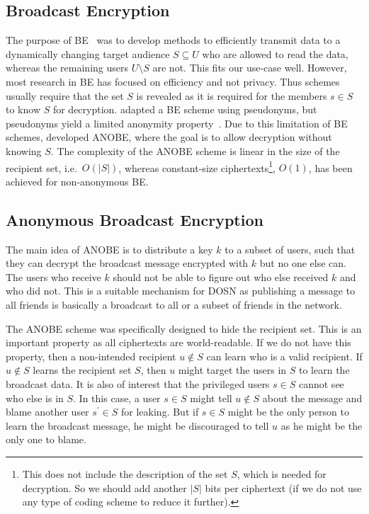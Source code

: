 \subsection{Broadcast Encryption}\label{sec:BE}

The purpose of \ac{BE}~\cite{broadcastenc} was to develop methods to 
efficiently transmit data to a dynamically changing target audience 
\(S\subseteq U\) who are allowed to read the data, whereas the remaining users 
\(U\setminus S\) are not.
This fits our use-case well.
However, most research in \ac{BE} has focused on efficiency and not privacy.
Thus schemes usually require that the set \(S\) is revealed as it is required 
for the members \(s\in S\) to know \(S\) for decryption.
\citet{gunther2012cryptographic} adapted a \ac{BE} scheme using pseudonyms, but 
pseudonyms yield a limited anonymity property~\cite{gunther2012cryptographic}.
Due to this limitation of \ac{BE} schemes, \citet{anobe} developed \ac{ANOBE}, 
where the goal is to allow decryption without knowing \(S\).
The complexity of the \ac{ANOBE} scheme is linear in the size of the recipient 
set, i.e.~\(O(|S|)\), whereas constant-size ciphertexts\footnote{%
  This does not include the description of the set \(S\), which is needed for 
  decryption.
  So we should add another \(|S|\) bits per ciphertext (if we do not use any 
  type of coding scheme to reduce it further).
}, \(O(1)\), has been achieved for non-anonymous \ac{BE}.

\subsection{Anonymous Broadcast Encryption}\label{sec:ANOBE}
The main idea of \ac{ANOBE} is to distribute a key \(k\) to a subset of users, 
such that they can decrypt the broadcast message encrypted with \(k\) but no 
one else can.
The users who receive \(k\) should not be able to figure out who else received 
\(k\) and who did not.
This is a suitable mechanism for \ac{DOSN} as publishing a message to all 
friends is basically a broadcast to all or a subset of friends in the network.

The \ac{ANOBE} scheme was specifically designed to hide the recipient set.
This is an important property as all ciphertexts are world-readable.
If we do not have this property, then a non-intended recipient \(u\notin S\) 
can learn who is a valid recipient.
If \(u\notin S\) learns the recipient set \(S\), then \(u\) might target the 
users in \(S\) to learn the broadcast data.
It is also of interest that the privileged users \(s\in S\) cannot see who else 
is in \(S\).
In this case, a user \(s\in S\) might tell \(u\notin S\) about the message and 
blame another user \(s^\prime\in S\) for leaking.
But if \(s\in S\) might be the only person to learn the broadcast message, he 
might be discouraged to tell \(u\) as he might be the only one to blame.

